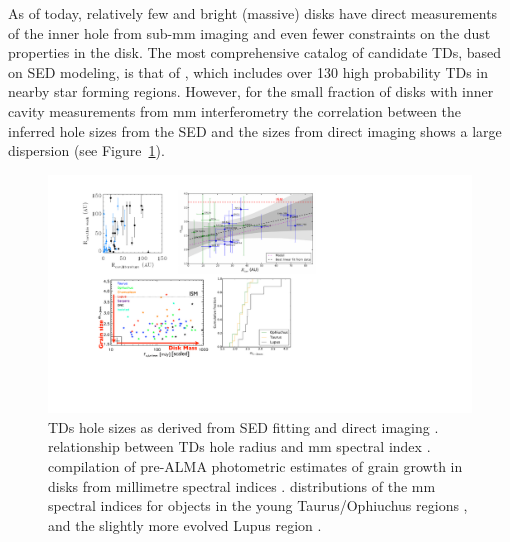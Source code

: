 \documentclass[10pt,fleqn,twoside]{article}
\begin{document}
As of today, relatively few and bright (massive) disks have direct measurements of the inner hole from sub-mm imaging
and even fewer constraints on the dust properties in the disk. The most comprehensive catalog of candidate TDs, based on SED modeling, is that of \citet{2016A&A...592A.126V}, which includes over 130 high probability TDs in nearby star forming regions. However, for the small fraction of disks with inner cavity measurements from mm interferometry the correlation between the inferred hole sizes from the SED and the sizes from direct imaging shows a large dispersion (see Figure~\ref{f_TDsiz}). 
\begin{figure}
\centerline{\includegraphics[scale=0.7]{f_dust_radii_tds.pdf}}
\caption{ TDs hole sizes as derived from SED fitting
  and direct imaging \citep[black points only; adapted from][]{2016A&A...592A.126V}. 
   relationship between TDs hole radius
  and mm spectral index \citep[as a proxy of grain growth in disks, large grains
  correspond to small values of $\alpha$; adapted from][]{2014A&A...564A..51P}. 
   compilation of pre-ALMA photometric
  estimates of grain growth in disks from millimetre spectral indices
  \citep[adapted from][]{2014arXiv1402.1354T}. 
  distributions of the mm spectral indices for objects in the young
  Taurus/Ophiuchus regions  
  \citep[yellow/green lines, data from][]{2010A&A...521A..66R,2010A&A...512A..15R}, 
  and the slightly more evolved Lupus region \citep[black line, data
  from][]{2007A&A...462..211L,2012MNRAS.425.3137U}.}
\label{f_TDsiz}
\end{figure}
\end{document}
